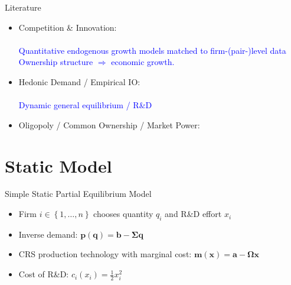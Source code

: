 \documentclass[english,aspectratio=169,handout]{beamer}
\theoremstyle{plain}
\newcommand{\mat}[1]{\bm{#1}}
\newcommand{\vect}[1]{\mathbf{#1}}
\begin{document}
\begin{frame}{Literature}
  \begin{itemize}
    \item Competition \& Innovation: \\
          {\footnotesize\citet{d-Aspremont1988-je,Aghion2001-yc,Aghion2005-vw,Acemoglu2012-bj,Aghion2013-nq,Bloom2013-pn,Lopez2019-sl,Peters2020-sd,Akcigit2021-ns,Akcigit2023-zl,Liu2022-iw,Cavenaile2023-lo,Anton2023-ej,Anton2024-pw,Kini2024-kd,Hopenhayn2024-ya}}\\
          \textcolor{blue}{Quantitative endogenous growth models matched to firm-(pair-)level
            data}\\
          \textcolor{blue}{Ownership structure $\Longrightarrow$ economic growth.}
    \item Hedonic Demand / Empirical IO: \\
          {\footnotesize\citet{Lancaster1966-sg,Rosen1974-ep,Berry1995-lx,Nevo2001-ja,Pellegrino2024-dn,Ederer2024-rw}}\\
          \textcolor{blue}{Dynamic general equilibrium / R\&D}
    \item Oligopoly / Common Ownership / Market Power: \\
          {\footnotesize\citet{Rubinstein1983-pi,Rotemberg1984-jz,Neary2003-sn,Atkeson2008-zc,Gutierrez2017-wl,He2017-ix,Azar2018-cc,Azar2022-cn,Autor2020-mr,Baqaee2020-eb,De_Loecker2020-jn,Azar2021-uh,Edmond2023-bg}}
  \end{itemize}
\end{frame}

\section{Static Model}

\begin{frame}{Simple Static Partial Equilibrium Model}
  \begin{itemize}
    \item Firm $i\in \left\{1,\ldots, n\right\}$ chooses quantity $q_i$ and R\&D effort $x_i$
          \medskip{}
    \item Inverse demand: $\vect{p}(\vect{q}) = \vect{b} - \mat{\Sigma} \vect{q}$\medskip{}
    \item CRS production technology with marginal cost: $\vect{m}(\vect{x}) = \vect{a} - \mat{\Omega} \vect{x}$\medskip{}
    \item Cost of R\&D: $c_i(x_i) = \frac{1}{2}x_i^2$
  \end{itemize}
\end{frame}
\end{document}
